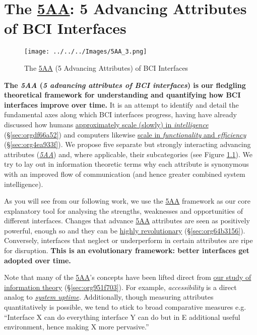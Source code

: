\documentclass[logo,bsc,singlespacing,parskip]{infthesis}
\begin{document}
\chapter{The \hyperref[org85f90e8]{5AA}: 5 Advancing Attributes of BCI Interfaces}
\label{sec:org921fce9}
\begin{figure}[H]
\centering
\texttt{[image: ../../../Images/5AA\_3.png]}
\caption{\label{fig:5AA}The \hyperref[org85f90e8]{5AA} (5 Advancing Attributes) of BCI Interfaces}
\end{figure}

\textbf{The \emph{\label{org85f90e8}5AA} (\emph{5 advancing attributes of BCI interfaces}) is our fledgling theoretical framework for understanding and quantifying how BCI interfaces improve over time.}
It is an attempt to identify and detail the fundamental axes along which BCI interfaces progress, having have already discussed how humans \hyperref[sec:orgdf66a52]{approximately scale (slowly) in \emph{intelligence}} (\S \ref{sec:orgdf66a52}) and computers likewise \hyperref[sec:org4ea933f]{scale in \emph{functionality} and \emph{efficiency}} (\S \ref{sec:org4ea933f}).
We propose five separate but strongly interacting advancing attributes (\emph{\hyperref[org85f90e8]{5AA}}) and, where applicable, their subcategories (see Figure \ref{fig:5AA}).
We try to lay out in information theoretic terms why each attribute is synonymous with an improved flow of communication (and hence greater combined system intelligence).

As you will see from our following work, we use the \hyperref[org85f90e8]{5AA} framework as our core explanatory tool for analysing the strengths, weaknesses and opportunities of different interfaces.
Changes that advance \hyperref[org85f90e8]{5AA} attributes are seen as positively powerful, enough so and they can be \hyperref[sec:org64b3156]{highly revolutionary} (\S \ref{sec:org64b3156}).
Conversely, interfaces that neglect or underperform in certain attributes are ripe for disruption.
\textbf{This is an evolutionary framework: better interfaces get adopted over time.}

Note that many of the \hyperref[org85f90e8]{5AA}'s concepts have been lifted direct from \hyperref[sec:org951f703]{our study of information theory} (\S \ref{sec:org951f703}).
For example, \emph{accessibility} is a direct analog to \emph{\hyperref[org6a2e751]{system uptime}.}
Additionally, though measuring attributes quantitatively is possible, we tend to stick to broad comparative measures e.g. ``Interface X can do everything interface Y can do but in E additional useful environment, hence making X more pervasive.''
\end{document}
